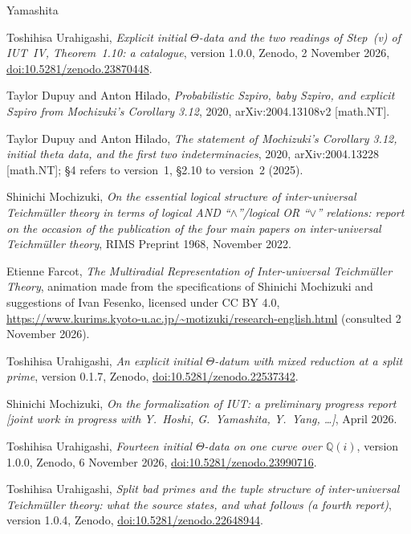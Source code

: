 \documentclass[11pt,a4paper]{article}
\newcommand{\Q}{\mathbb{Q}}
\begin{document}
\begin{thebibliography}{Yamashita}

Toshihisa Urahigashi, \emph{Explicit initial $\Theta$-data and the two readings of Step~(v) of IUT~IV,
Theorem~1.10: a catalogue}, version 1.0.0, Zenodo, 2 November 2026,
\href{https://doi.org/10.5281/zenodo.23870448}{doi:10.5281/zenodo.23870448}.

Taylor Dupuy and Anton Hilado, \emph{Probabilistic {S}zpiro, baby {S}zpiro, and explicit {S}zpiro from
{M}ochizuki's {C}orollary 3.12}, 2020, arXiv:2004.13108v2 [math.NT].

Taylor Dupuy and Anton Hilado, \emph{The statement of {M}ochizuki's {C}orollary 3.12, initial theta data, and
the first two indeterminacies}, 2020, arXiv:2004.13228 [math.NT]; \S4 refers to version~1, \S2.10 to version~2
(2025).

Shinichi Mochizuki, \emph{On the essential logical structure of inter-universal {T}eichm\"uller theory in
terms of logical {AND} ``$\wedge$''/logical {OR} ``$\vee$'' relations: report on the occasion of the
publication of the four main papers on inter-universal {T}eichm\"uller theory}, RIMS Preprint 1968, November
2022.

Etienne Farcot, \emph{The Multiradial Representation of Inter-universal Teichm\"uller Theory}, animation made
from the specifications of Shinichi Mochizuki and suggestions of Ivan Fesenko, licensed under CC BY 4.0,
\url{https://www.kurims.kyoto-u.ac.jp/~motizuki/research-english.html} (consulted 2 November 2026).

Toshihisa Urahigashi, \emph{An explicit initial $\Theta$-datum with mixed reduction at a split prime},
version 0.1.7, Zenodo, \href{https://doi.org/10.5281/zenodo.22537342}{doi:10.5281/zenodo.22537342}.

Shinichi Mochizuki, \emph{On the formalization of {IUT}: a preliminary progress report [joint work in progress
with {Y.~Hoshi}, {G.~Yamashita}, {Y.~Yang}, \dots]}, April 2026.

Toshihisa Urahigashi, \emph{Fourteen initial $\Theta$-data on one curve over $\Q(i)$}, version 1.0.0, Zenodo,
6 November 2026, \href{https://doi.org/10.5281/zenodo.23990716}{doi:10.5281/zenodo.23990716}.

Toshihisa Urahigashi, \emph{Split bad primes and the tuple structure of inter-universal {T}eichm\"uller theory: what
the source states, and what follows (a fourth report)}, version 1.0.4, Zenodo,
\href{https://doi.org/10.5281/zenodo.22648944}{doi:10.5281/zenodo.22648944}.


\end{thebibliography}
\end{document}
